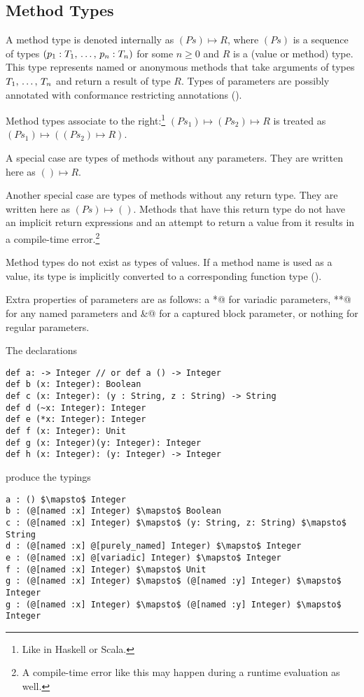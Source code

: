 \subsection{Method Types}
\label{sec:method-types}

A method type is denoted internally as $(Ps) \mapsto R$, where $(Ps)$ is a sequence of types  $(p_1 : T_1 ,\, \ldots ,\, p_n : T_n)$ for some $n \geq 0$ and $R$ is a (value or method) type. This type represents named or anonymous methods that take arguments of types $T_1 ,\, \ldots ,\, T_n$ and return a result of type $R$. Types of parameters are possibly annotated with conformance restricting annotations (). 

Method types associate to the right:\footnote{Like in Haskell or Scala.} \newline
$(Ps_1) \mapsto (Ps_2) \mapsto R$ is treated as $(Ps_1) \mapsto ((Ps_2) \mapsto R)$. 

A special case are types of methods without any parameters. They are written here as $() \mapsto R$. 

Another special case are types of methods without any return type. They are written here as $(Ps) \mapsto ()$. Methods that have this return type do not have an implicit return expressions and an attempt to return a value from it results in a compile-time error.\footnote{A compile-time error like this may happen during a runtime evaluation as well.}

Method types do not exist as types of values. If a method name is used as a value, its type is implicitly converted to a corresponding function type (). 

Extra properties of parameters are as follows: a \lstinline@*@ for variadic parameters, \lstinline@**@ for any named parameters and \lstinline@&@ for a captured block parameter, or nothing for regular parameters. 

\example The declarations
\begin{lstlisting}
def a: -> Integer // or def a () -> Integer
def b (x: Integer): Boolean
def c (x: Integer): (y : String, z : String) -> String
def d (~x: Integer): Integer
def e (*x: Integer): Integer
def f (x: Integer): Unit
def g (x: Integer)(y: Integer): Integer
def h (x: Integer): (y: Integer) -> Integer
\end{lstlisting}
produce the typings
\begin{lstlisting}
a : () $\mapsto$ Integer
b : (@[named :x] Integer) $\mapsto$ Boolean
c : (@[named :x] Integer) $\mapsto$ (y: String, z: String) $\mapsto$ String
d : (@[named :x] @[purely_named] Integer) $\mapsto$ Integer
e : (@[named :x] @[variadic] Integer) $\mapsto$ Integer
f : (@[named :x] Integer) $\mapsto$ Unit
g : (@[named :x] Integer) $\mapsto$ (@[named :y] Integer) $\mapsto$ Integer
g : (@[named :x] Integer) $\mapsto$ (@[named :y] Integer) $\mapsto$ Integer
\end{lstlisting}

